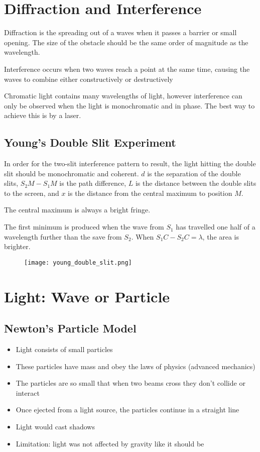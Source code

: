 \section{Diffraction and Interference} \label{15/05/2025}
	
	Diffraction is the spreading out of a waves when it passes a barrier or small opening. The size of the obstacle should be the same order of magnitude as the wavelength.

	Interference occurs when two waves reach a point at the same time, causing the waves to combine either constructively or destructively

	Chromatic light contains many wavelengths of light, however interference can only be observed when the light is monochromatic and in phase. The best way to achieve this is by a laser.

	\subsection{Young's Double Slit Experiment}
	
		In order for the two-slit interference pattern to result, the light hitting the double slit should be monochromatic and coherent. $d$ is the separation of the double slits, $S_{2}M - S_{1}M$ is the path difference, $L$ is the distance between the double slits to the screen, and $x$ is the distance from the central maximum to position $M$.

		The central maximum is always a bright fringe.

		The first minimum is produced when the wave from $S_1$ has travelled one half of a wavelength further than the save from $S_2$. When $S_1 C - S_2 C = \lambda$, the area is brighter.

		\begin{figure}[H]
			\centering
			\texttt{[image: young\_double\_slit.png]}
		\end{figure}

\section{Light: Wave or Particle} \label{20/05/2025}

	\subsection{Newton's Particle Model}
		
		\begin{itemize}
			\item Light consists of small particles
			\item These particles have mass and obey the laws of physics (advanced mechanics)
			\item The particles are so small that when two beams cross they don't collide or interact
			\item Once ejected from a light source, the particles continue in a straight line
			\item Light would cast shadows
			\item Limitation: light was not affected by gravity like it should be
		\end{itemize}
	
